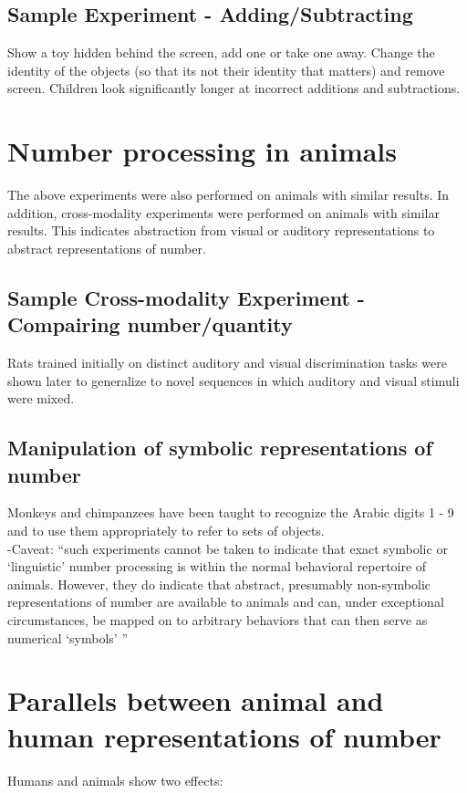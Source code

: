 \documentclass[12pt]{article}
\begin{document}
\subsection*{Sample Experiment - Adding/Subtracting}
Show a toy hidden behind the screen, add one or take one away. Change the identity of the objects (so that its not their identity that matters) and remove screen. Children look significantly longer at incorrect additions and subtractions.

\section{Number processing in animals}
The above experiments were also performed on animals with similar results. In addition, cross-modality experiments were performed on animals with similar results. This indicates abstraction from visual or auditory representations to abstract representations of number.

\subsection*{Sample Cross-modality Experiment - Compairing number/quantity}
Rats trained initially on distinct
auditory and visual discrimination tasks were shown
later to generalize to novel sequences in which auditory
and visual stimuli were mixed.

\subsection*{Manipulation of symbolic representations of number}
Monkeys and chimpanzees have been
taught to recognize the Arabic digits 1 - 9 and to use them
appropriately to refer to sets of objects.\\
-Caveat: ``such experiments
cannot be taken to indicate that exact symbolic
or ‘linguistic’ number processing is within the normal
behavioral repertoire of animals. However, they do
indicate that abstract, presumably non-symbolic representations
of number are available to animals and
can, under exceptional circumstances, be mapped on
to arbitrary behaviors that can then serve as numerical
‘symbols’ ''

\section{Parallels between animal and human
representations of number}

Humans and animals show two effects:
\end{document}
